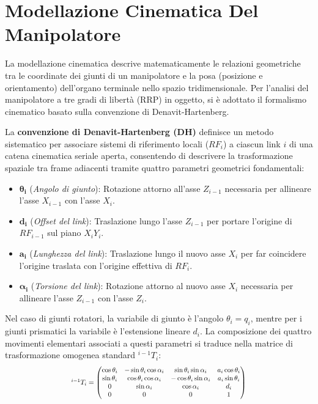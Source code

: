 \documentclass[11pt, a4paper]{report}
\begin{document}


\chapter{Modellazione Cinematica Del Manipolatore}
\label{chap:modellazione_cinematica}

La modellazione cinematica descrive matematicamente le relazioni geometriche tra le coordinate dei giunti di un manipolatore e la posa (posizione e orientamento) dell'organo terminale nello spazio tridimensionale. Per l'analisi del manipolatore a tre gradi di libertà (RRP) in oggetto, si è adottato il formalismo cinematico basato sulla convenzione di Denavit-Hartenberg.

La \textbf{convenzione di Denavit-Hartenberg (DH)} definisce un metodo sistematico per associare sistemi di riferimento locali (\(RF_i\)) a ciascun link \(i\) di una catena cinematica seriale aperta, consentendo di descrivere la trasformazione spaziale tra frame adiacenti tramite quattro parametri geometrici fondamentali:
\begin{itemize}
    \item \(\bm{\theta_i}\) (\textit{Angolo di giunto}): Rotazione attorno all'asse \(Z_{i-1}\) necessaria per allineare l'asse \(X_{i-1}\) con l'asse \(X_i\).
    \item \(\bm{d_i}\) (\textit{Offset del link}): Traslazione lungo l'asse \(Z_{i-1}\) per portare l'origine di \(RF_{i-1}\) sul piano \(X_i Y_i\).
    \item \(\bm{a_i}\) (\textit{Lunghezza del link}): Traslazione lungo il nuovo asse \(X_i\) per far coincidere l'origine traslata con l'origine effettiva di \(RF_i\).
    \item \(\bm{\alpha_i}\) (\textit{Torsione del link}): Rotazione attorno al nuovo asse \(X_i\) necessaria per allineare l'asse \(Z_{i-1}\) con l'asse \(Z_i\).
\end{itemize}

Nel caso di giunti rotatori, la variabile di giunto è l'angolo \(\theta_i = q_i\), mentre per i giunti prismatici la variabile è l'estensione lineare \(d_i\). La composizione dei quattro movimenti elementari associati a questi parametri si traduce nella matrice di trasformazione omogenea standard \(^{i-1}T_i\):
\[
\scalebox{0.8}{$
    ^{i-1}T_i =
    \begin{pmatrix}
        \cos\theta_i & -\sin\theta_i\cos\alpha_i & \sin\theta_i\sin\alpha_i & a_i\cos\theta_i \\
        \sin\theta_i & \cos\theta_i\cos\alpha_i & -\cos\theta_i\sin\alpha_i & a_i\sin\theta_i \\
        0 & \sin\alpha_i & \cos\alpha_i & d_i \\
        0 & 0 & 0 & 1
    \end{pmatrix}
$}
\]
\end{document}
